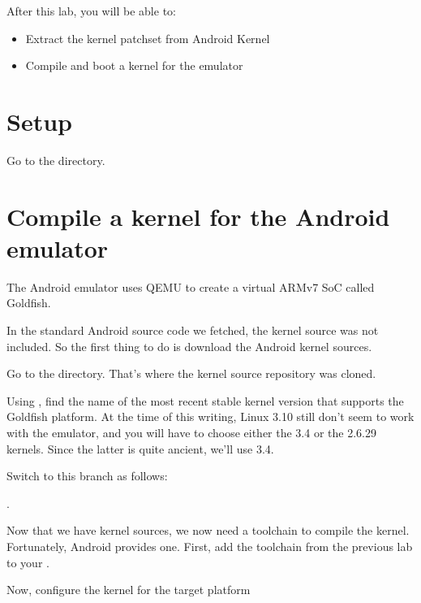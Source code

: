 
After this lab, you will be able to:
\begin{itemize}
  \item Extract the kernel patchset from Android Kernel
  \item Compile and boot a kernel for the emulator
\end{itemize}

\section{Setup}

Go to the  directory.

\section{Compile a kernel for the Android emulator}

The Android emulator uses QEMU to create a virtual ARMv7 SoC called
Goldfish.

In the standard Android source code we fetched, the kernel source was
not included.  So the first thing to do is download the Android kernel
sources.


Go to the  directory. That's where the kernel source
repository was cloned.

Using , find the name of the most recent stable
kernel version that supports the Goldfish platform. At the time of
this writing, Linux 3.10 still don't seem to work with the emulator,
and you will have to choose either the 3.4 or the 2.6.29
kernels. Since the latter is quite ancient, we'll use 3.4.

Switch to this branch as follows:

.

Now that we have kernel sources, we now need a toolchain to compile
the kernel. Fortunately, Android provides one. First, add the
toolchain from the previous lab to your .


Now, configure the kernel for the target platform


